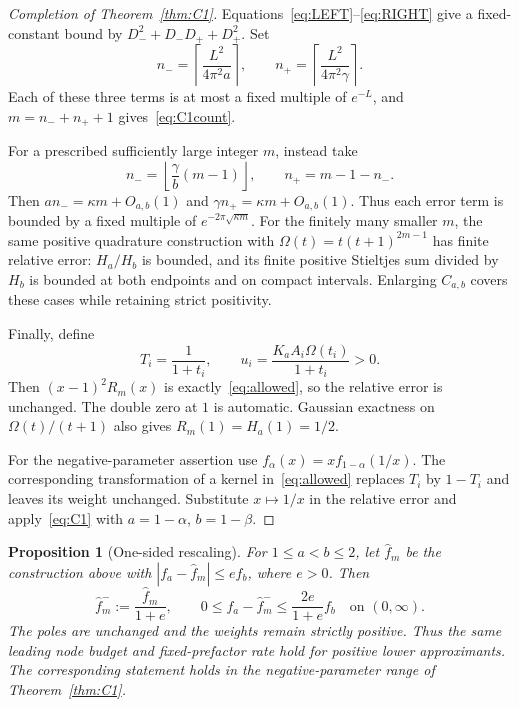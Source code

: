 \documentclass[11pt]{article}
\newtheorem{proposition}[theorem]{Proposition}
\numberwithin{equation}{section}
\begin{document}
\begin{proof}[Completion of Theorem~\ref{thm:C1}]
Equations~\eqref{eq:LEFT}--\eqref{eq:RIGHT} give a fixed-constant bound
by $D_-^2+D_-D_++D_+^2$. Set
\begin{equation}\label{eq:allocationL}
 n_-=\left\lceil\frac{L^2}{4\pi^2a}\right\rceil,
 \qquad n_+=\left\lceil\frac{L^2}{4\pi^2\gamma}\right\rceil.
\end{equation}
Each of these three terms is at most a fixed multiple of $e^{-L}$,
and $m=n_-+n_++1$ gives~\eqref{eq:C1count}.

For a prescribed sufficiently large integer $m$, instead take
\[
 n_-=\left\lfloor\frac\gamma b(m-1)\right\rfloor,
 \qquad n_+=m-1-n_-.
\]
Then $a n_- =\kappa m+O_{a,b}(1)$ and
$\gamma n_+=\kappa m+O_{a,b}(1)$. Thus each error term is bounded by
a fixed multiple of $e^{-2\pi\sqrt{\kappa m}}$.
For the finitely many smaller $m$, the same positive quadrature
construction with $\Omega(t)=t(t+1)^{2m-1}$ has finite relative error:
$H_a/H_b$ is bounded, and its finite positive Stieltjes sum divided by
$H_b$ is bounded at both endpoints and on compact intervals.
Enlarging $C_{a,b}$ covers these cases while retaining strict positivity.

Finally, define
\[
 T_i=\frac1{1+t_i},\qquad
 u_i=\frac{K_a A_i\Omega(t_i)}{1+t_i}>0.
\]
Then $(x-1)^2R_m(x)$ is exactly~\eqref{eq:allowed}, so the relative
error is unchanged. The double zero at $1$ is automatic. Gaussian
exactness on $\Omega(t)/(t+1)$ also gives $R_m(1)=H_a(1)=1/2$.

For the negative-parameter assertion use
$f_\alpha(x)=x f_{1-\alpha}(1/x)$. The corresponding transformation
of a kernel in~\eqref{eq:allowed} replaces $T_i$ by $1-T_i$ and
leaves its weight unchanged. Substitute $x\mapsto1/x$ in the relative
error and apply~\eqref{eq:C1} with $a=1-\alpha$, $b=1-\beta$.
\end{proof}

\begin{proposition}[One-sided rescaling]\label{prop:onesided}
For $1\le a<b\le2$, let $\widehat f_m$ be the construction above with
$|f_a-\widehat f_m|\le e f_b$, where $e>0$. Then
\begin{equation}\label{eq:onesided}
 \widehat f_m^-:=\frac{\widehat f_m}{1+e},\qquad
 0\le f_a-\widehat f_m^-\le\frac{2e}{1+e}f_b
 \quad\text{on }(0,\infty).
\end{equation}
The poles are unchanged and the weights remain strictly positive.
Thus the same leading node budget and fixed-prefactor rate hold for
positive lower approximants. The corresponding statement holds in
the negative-parameter range of Theorem~\ref{thm:C1}.
\end{proposition}
\end{document}

